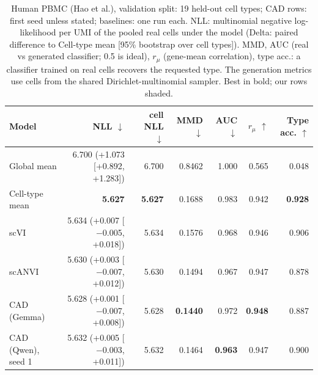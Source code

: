 \begin{table}[htbp]
\centering
\small
\setlength{\tabcolsep}{4pt}
\begin{tabular}{lrrrrrr}
\toprule
Model & NLL $\downarrow$ & cell NLL $\downarrow$ & MMD $\downarrow$ & AUC $\downarrow$ & $r_\mu$ $\uparrow$ & Type acc. $\uparrow$ \\
\midrule
Global mean & 6.700 (+1.073 [+0.892, +1.283]) & 6.700 & 0.8462 & 1.000 & 0.565 & 0.048 \\
Cell-type mean & \textbf{5.627} & \textbf{5.627} & 0.1688 & 0.983 & 0.942 & \textbf{0.928} \\
scVI & 5.634 (+0.007 [$-$0.005, +0.018]) & 5.634 & 0.1576 & 0.968 & 0.946 & 0.906 \\
scANVI & 5.630 (+0.003 [$-$0.007, +0.012]) & 5.630 & 0.1494 & 0.967 & 0.947 & 0.878 \\
\rowcolor{ours}CAD (Gemma) & 5.628 (+0.001 [$-$0.007, +0.008]) & 5.628 & \textbf{0.1440} & 0.972 & \textbf{0.948} & 0.887 \\
\rowcolor{ours}CAD (Qwen), seed 1 & 5.632 (+0.005 [$-$0.003, +0.011]) & 5.632 & 0.1464 & \textbf{0.963} & 0.947 & 0.900 \\
\bottomrule
\end{tabular}
\caption{Human PBMC (Hao et al.), validation split: 19 held-out cell types; CAD rows: first seed unless stated; baselines: one run each. NLL: multinomial negative log-likelihood per UMI of the pooled real cells under the model (Delta: paired difference to Cell-type mean [95\% bootstrap over cell types]). MMD, AUC (real vs generated classifier; 0.5 is ideal), $r_\mu$ (gene-mean correlation), type acc.: a classifier trained on real cells recovers the requested type. The generation metrics use cells from the shared Dirichlet-multinomial sampler. Best in bold; our rows shaded.}
\label{tab:val_cond}
\end{table}